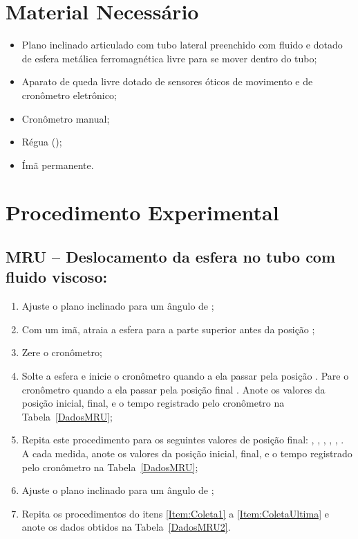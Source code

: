 \section{Material Necessário}

\begin{itemize}
	\item Plano inclinado articulado com tubo lateral preenchido com fluido e dotado de esfera metálica ferromagnética livre para se mover dentro do tubo;
	\item Aparato de queda livre dotado de sensores óticos de movimento e de cronômetro eletrônico;
	\item Cronômetro manual;
	\item Régua ();
	\item Ímã permanente.
\end{itemize}

\section{Procedimento Experimental}

\subsection{MRU -- Deslocamento da esfera no tubo com fluido viscoso:}

\begin{enumerate}
	\item Ajuste o plano inclinado para um ângulo de ;
	\item Com um imã, atraia a esfera para a parte superior antes da posição ;\label{Item:Coleta1}
	\item Zere o cronômetro;
	\item Solte a esfera e inicie o cronômetro quando a ela passar pela posição . Pare o cronômetro quando a ela passar pela posição final . Anote os valores da posição inicial, final, e o tempo registrado pelo cronômetro na Tabela~\ref{DadosMRU};
	\item Repita este procedimento para os seguintes valores de posição final: , , , , , . A cada medida, anote os valores da posição inicial, final, e o tempo registrado pelo cronômetro na Tabela~\ref{DadosMRU};\label{Item:ColetaUltima}
	\item Ajuste o plano inclinado para um ângulo de ;
	\item Repita os procedimentos do itens \ref{Item:Coleta1} a \ref{Item:ColetaUltima} e anote os dados obtidos na Tabela~\ref{DadosMRU2}.
\end{enumerate}

